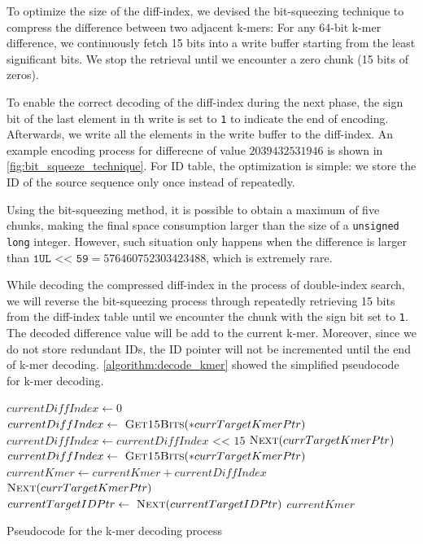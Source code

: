 To optimize the size of the diff-index, we devised the bit-squeezing technique to compress the difference between two adjacent k-mers:
For any 64-bit k-mer difference, we continuously fetch 15 bits into a write buffer starting from the least significant bits. We stop the retrieval until we encounter a zero chunk (15 bits of zeros).

To enable the correct decoding of the diff-index during the next phase, the sign bit of the last element in th write is set to \texttt{1} to indicate the end of encoding. Afterwards, we write all the elements in the write buffer to the diff-index. An example encoding process for differecne of value $2039432531946$ is shown in \autoref{fig:bit_squeeze_technique}. For ID table, the optimization is simple: we store the ID of the source sequence only once instead of repeatedly.

Using the bit-squeezing method, it is possible to obtain a maximum of five chunks, making the final space consumption larger than the size of a \texttt{unsigned long} integer. However, such situation only happens when the difference is larger than $\texttt{1UL << 59} = 576460752303423488$, which is extremely rare.

While decoding the compressed diff-index in the process of double-index search, we will reverse the bit-squeezing process through repeatedly retrieving 15 bits from the diff-index table until we encounter the chunk with the sign bit set to \texttt{1}. The decoded difference value will be add to the current k-mer. Moreover, since we do not store redundant IDs, the ID pointer will not be incremented until the end of k-mer decoding. \cref{algorithm:decode_kmer} showed the simplified pseudocode for k-mer decoding.

\begin{algorithm}[htbp]
  \begin{algorithmic}

    \State $currentDiffIndex \gets 0$\;
    \State $currentDiffIndex \gets\ \textsc{Get15Bits}(*currTargetKmerPtr)$
    \State $currentDiffIndex \gets currentDiffIndex \texttt{ << } 15$
    \State $\textsc{Next}(currTargetKmerPtr)$
    \EndWhile
    \State $currentDiffIndex \gets\ \textsc{Get15Bits}(*currTargetKmerPtr)$
    \State $currentKmer \gets currentKmer + currentDiffIndex$
    \State $\textsc{Next}(currTargetKmerPtr)$
    \State $currentTargetIDPtr \gets\ \textsc{Next}(currentTargetIDPtr)$
    \Return $currentKmer$
    \EndProcedure
    \caption{ Pseudocode for the k-mer decoding process} \label{algorithm:decode_kmer}
  \end{algorithmic}
\end{algorithm}

